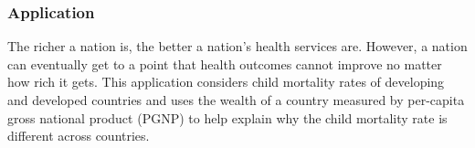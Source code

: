 \documentclass[
]{book}
\newenvironment{Shaded}{\begin{snugshade}}{\end{snugshade}}
\newcommand{\DecValTok}[1]{\textcolor[rgb]{0.00,0.00,0.81}{#1}}
\newcommand{\FunctionTok}[1]{\textcolor[rgb]{0.00,0.00,0.00}{#1}}
\newcommand{\NormalTok}[1]{#1}
\newcommand{\OtherTok}[1]{\textcolor[rgb]{0.56,0.35,0.01}{#1}}
\newcommand{\SpecialCharTok}[1]{\textcolor[rgb]{0.00,0.00,0.00}{#1}}
\newcommand{\StringTok}[1]{\textcolor[rgb]{0.31,0.60,0.02}{#1}}
\begin{document}
\hypertarget{application-7}{%
\subsubsection*{Application}\label{application-7}}

The richer a nation is, the better a nation's health services are. However, a nation can eventually get to a point that health outcomes cannot improve no matter how rich it gets. This application considers child mortality rates of developing and developed countries and uses the wealth of a country measured by per-capita gross national product (PGNP) to help explain why the child mortality rate is different across countries.

\begin{Shaded}
\end{Shaded}
\end{document}

